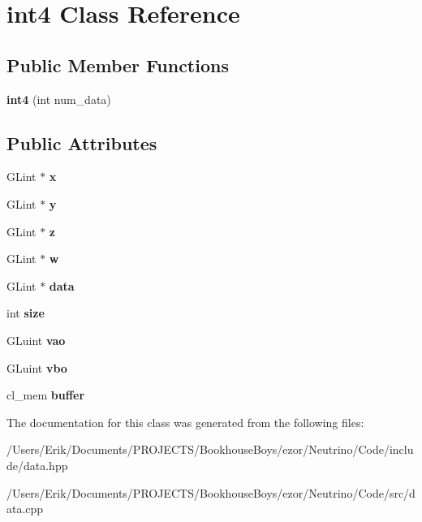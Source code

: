 \hypertarget{classint4}{}\section{int4 Class Reference}
\label{classint4}
\subsection*{Public Member Functions}
\begin{DoxyCompactItemize}
\item 
\mbox{\label{classint4_a673a50efc9d0ad7d41b2189573e6a62e}} 
{\bfseries int4} (int num\+\_\+data)
\end{DoxyCompactItemize}
\subsection*{Public Attributes}
\begin{DoxyCompactItemize}
\item 
\mbox{\label{classint4_a04ffe739cca2e88ba012137d4d3e7e37}} 
G\+Lint $\ast$ {\bfseries x}
\item 
\mbox{\label{classint4_ac9800eea2ec193136a789a21457cf30b}} 
G\+Lint $\ast$ {\bfseries y}
\item 
\mbox{\label{classint4_a4bb581886c2a4d265c27ba5d3e52bf6a}} 
G\+Lint $\ast$ {\bfseries z}
\item 
\mbox{\label{classint4_a3db1dbcf661412d406a58bf68a0ca1d3}} 
G\+Lint $\ast$ {\bfseries w}
\item 
\mbox{\label{classint4_a2ec903dd4d2653ecf0c3274f72cdae21}} 
G\+Lint $\ast$ {\bfseries data}
\item 
\mbox{\label{classint4_a363d9e8d2c756b879da801f2fe96e0ed}} 
int {\bfseries size}
\item 
\mbox{\label{classint4_a3dcd1f4040fac8f9b8f9abccf4279511}} 
G\+Luint {\bfseries vao}
\item 
\mbox{\label{classint4_a4e4e7115c19b4fb9887519a962e7582a}} 
G\+Luint {\bfseries vbo}
\item 
\mbox{\label{classint4_a507a012f70702888e42ca538bc4a7d0b}} 
cl\+\_\+mem {\bfseries buffer}
\end{DoxyCompactItemize}


The documentation for this class was generated from the following files\+:\begin{DoxyCompactItemize}
\item 
/\+Users/\+Erik/\+Documents/\+P\+R\+O\+J\+E\+C\+T\+S/\+Bookhouse\+Boys/ezor/\+Neutrino/\+Code/include/data.\+hpp\item 
/\+Users/\+Erik/\+Documents/\+P\+R\+O\+J\+E\+C\+T\+S/\+Bookhouse\+Boys/ezor/\+Neutrino/\+Code/src/data.\+cpp\end{DoxyCompactItemize}
